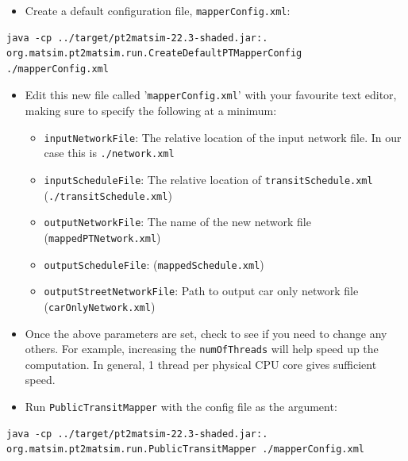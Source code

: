 \documentclass[11pt]{article}
\begin{document}
\begin{itemize}
\item Create a default configuration file, \texttt{mapperConfig.xml}:
\end{itemize}
\begin{verbatim}
java -cp ../target/pt2matsim-22.3-shaded.jar:. org.matsim.pt2matsim.run.CreateDefaultPTMapperConfig ./mapperConfig.xml
\end{verbatim}

\begin{itemize}
\item Edit this new file called '\texttt{mapperConfig.xml}' with your favourite text editor, making sure to specify the following at a minimum:
\begin{itemize}
\item \texttt{inputNetworkFile}: The relative location of the input network file. In our case this is \texttt{./network.xml}
\item \texttt{inputScheduleFile}: The relative location of \texttt{transitSchedule.xml} (\texttt{./transitSchedule.xml})
\item \texttt{outputNetworkFile}: The name of the new network file (\texttt{mappedPTNetwork.xml})
\item \texttt{outputScheduleFile}: (\texttt{mappedSchedule.xml})
\item \texttt{outputStreetNetworkFile}: Path to output car only network file (\texttt{carOnlyNetwork.xml})
\end{itemize}
\item Once the above parameters are set, check to see if you need to change any others. For example, increasing the \texttt{numOfThreads} will help speed up the computation. In general, 1 thread per physical CPU core gives sufficient speed.
\end{itemize}

\begin{itemize}
\item Run \texttt{PublicTransitMapper} with the config file as the argument:
\end{itemize}
\begin{verbatim}
java -cp ../target/pt2matsim-22.3-shaded.jar:. org.matsim.pt2matsim.run.PublicTransitMapper ./mapperConfig.xml
\end{verbatim}
\end{document}
